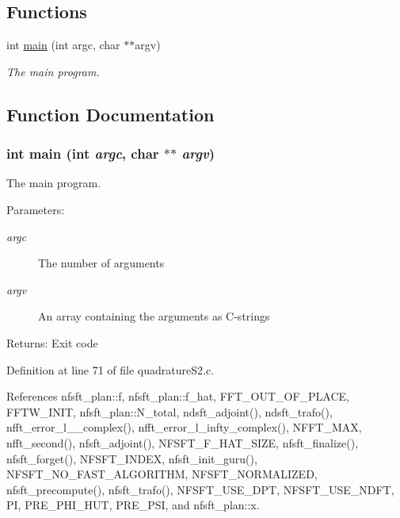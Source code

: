 \subsection*{Functions}
\begin{CompactItemize}
\item 
int \hyperlink{group__applications__quadratureS2__test_ga0}{main} (int argc, char $\ast$$\ast$argv)
\begin{CompactList}\small\item\em The main program. \item\end{CompactList}\end{CompactItemize}


\subsection{Function Documentation}
\hypertarget{group__applications__quadratureS2__test_ga0}{
\subsubsection[main]{\setlength{\rightskip}{0pt plus 5cm}int main (int {\em argc}, char $\ast$$\ast$ {\em argv})}}
\label{group__applications__quadratureS2__test_ga0}


The main program. 

\begin{Desc}
\item[Parameters:]
\begin{description}
\item[{\em argc}]The number of arguments \item[{\em argv}]An array containing the arguments as C-strings\end{description}
\end{Desc}
\begin{Desc}
\item[Returns:]Exit code \end{Desc}


Definition at line 71 of file quadrature\-S2.c.

References nfsft\_\-plan::f, nfsft\_\-plan::f\_\-hat, FFT\_\-OUT\_\-OF\_\-PLACE, FFTW\_\-INIT, nfsft\_\-plan::N\_\-total, ndsft\_\-adjoint(), ndsft\_\-trafo(), nfft\_\-error\_\-l\_\_\-complex(), nfft\_\-error\_\-l\_\-infty\_\-complex(), NFFT\_\-MAX, nfft\_\-second(), nfsft\_\-adjoint(), NFSFT\_\-F\_\-HAT\_\-SIZE, nfsft\_\-finalize(), nfsft\_\-forget(), NFSFT\_\-INDEX, nfsft\_\-init\_\-guru(), NFSFT\_\-NO\_\-FAST\_\-ALGORITHM, NFSFT\_\-NORMALIZED, nfsft\_\-precompute(), nfsft\_\-trafo(), NFSFT\_\-USE\_\-DPT, NFSFT\_\-USE\_\-NDFT, PI, PRE\_\-PHI\_\-HUT, PRE\_\-PSI, and nfsft\_\-plan::x.